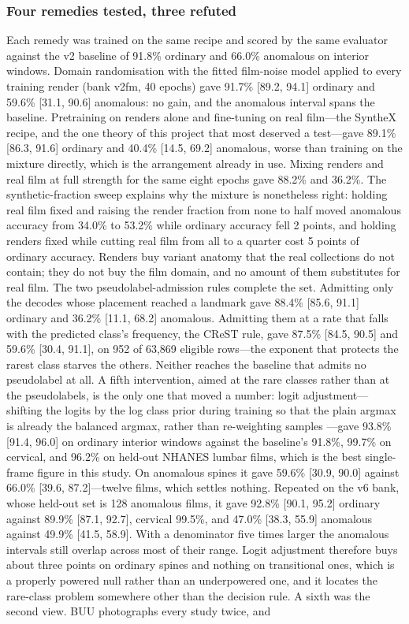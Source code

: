 \documentclass[11pt,letterpaper]{article}
\newcommand{\ci}[2]{[#1, #2]}
\begin{document}
\subsubsection*{Four remedies tested, three refuted}
Each remedy was trained on the same recipe and scored by the same evaluator against the v2 baseline of 91.8\% ordinary and 66.0\% anomalous on interior windows. Domain randomisation with the fitted film-noise model applied to every training render (bank v2fm, 40 epochs) gave 91.7\% \ci{89.2}{94.1} ordinary and 59.6\% \ci{31.1}{90.6} anomalous: no gain, and the anomalous interval spans the baseline. Pretraining on renders alone and fine-tuning on real film---the SyntheX recipe, and the one theory of this project that most deserved a test---gave 89.1\% \ci{86.3}{91.6} ordinary and 40.4\% \ci{14.5}{69.2} anomalous, worse than training on the mixture directly, which is the arrangement already in use. Mixing renders and real film at full strength for the same eight epochs gave 88.2\% and 36.2\%. The synthetic-fraction sweep explains why the mixture is nonetheless right: holding real film fixed and raising the render fraction from none to half moved anomalous accuracy from 34.0\% to 53.2\% while ordinary accuracy fell 2 points, and holding renders fixed while cutting real film from all to a quarter cost 5 points of ordinary accuracy. Renders buy variant anatomy that the real collections do not contain; they do not buy the film domain, and no amount of them substitutes for real film. The two pseudolabel-admission rules complete the set. Admitting only the decodes whose placement reached a landmark gave 88.4\% \ci{85.6}{91.1} ordinary and 36.2\% \ci{11.1}{68.2} anomalous. Admitting them at a rate that falls with the predicted class's frequency, the CReST rule, gave 87.5\% \ci{84.5}{90.5} and 59.6\% \ci{30.4}{91.1}, on 952 of 63,869 eligible rows---the exponent that protects the rarest class starves the others. Neither reaches the baseline that admits no pseudolabel at all. A fifth intervention, aimed at the rare classes rather than at the pseudolabels, is the only one that moved a number: logit adjustment---shifting the logits by the log class prior during training so that the plain argmax is already the balanced argmax, rather than re-weighting samples \citep{menon2021}---gave 93.8\% \ci{91.4}{96.0} on ordinary interior windows against the baseline's 91.8\%, 99.7\% on cervical, and 96.2\% on held-out NHANES lumbar films, which is the best single-frame figure in this study. On anomalous spines it gave 59.6\% \ci{30.9}{90.0} against 66.0\% \ci{39.6}{87.2}---twelve films, which settles nothing. Repeated on the v6 bank, whose held-out set is 128 anomalous films, it gave 92.8\% \ci{90.1}{95.2} ordinary against 89.9\% \ci{87.1}{92.7}, cervical 99.5\%, and 47.0\% \ci{38.3}{55.9} anomalous against 49.9\% \ci{41.5}{58.9}. With a denominator five times larger the anomalous intervals still overlap across most of their range. Logit adjustment therefore buys about three points on ordinary spines and nothing on transitional ones, which is a properly powered null rather than an underpowered one, and it locates the rare-class problem somewhere other than the decision rule. A sixth was the second view. BUU photographs every study twice, and 
\end{document}
